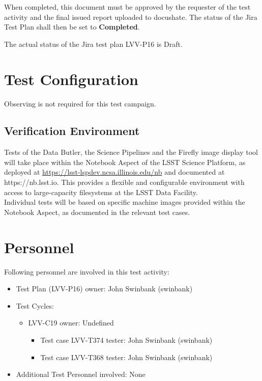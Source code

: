 \documentclass[DM,lsstdraft,STR,toc]{lsstdoc}
\begin{document}
When completed, this document must be approved by the requester of the test activity and
the final issued report uploaded to docushate. 
The status of the Jira Test Plan shall then be set to {\bf Completed}.

The actual status of the Jira test plan LVV-P16 is Draft.

\section{Test Configuration}
\label{sect:configuration}

Observing is not required for this test campaign.

\subsection{Verification Environment}
\label{sect:hwconf}
Tests of the Data Butler, the Science Pipelines and the Firefly image
display tool will take place within the Notebook Aspect of the LSST
Science Platform, as deployed at
\url{https://lsst-lspdev.ncsa.illinois.edu/nb} and documented at
https://nb.lsst.io. This provides a flexible and configurable
environment with access to large-capacity filesystems at the LSST Data
Facility.\\[2\baselineskip]Individual tests will be based on specific
machine images provided within the Notebook Aspect, as documented in the
relevant test cases.~





\section{Personnel}
\label{sect:personnel}

Following personnel are involved in this test activity:

\begin{itemize}
\item Test Plan (LVV-P16) owner: John Swinbank (swinbank)
\item Test Cycles:
\begin{itemize}
  \item LVV-C19 owner: 
Undefined
  \begin{itemize}
    \item Test case LVV-T374 tester: John Swinbank (swinbank)
    \item Test case LVV-T368 tester: John Swinbank (swinbank)
  \end{itemize}
\end{itemize}
\item Additional Test Personnel involved: None
\end{itemize}
\end{document}
